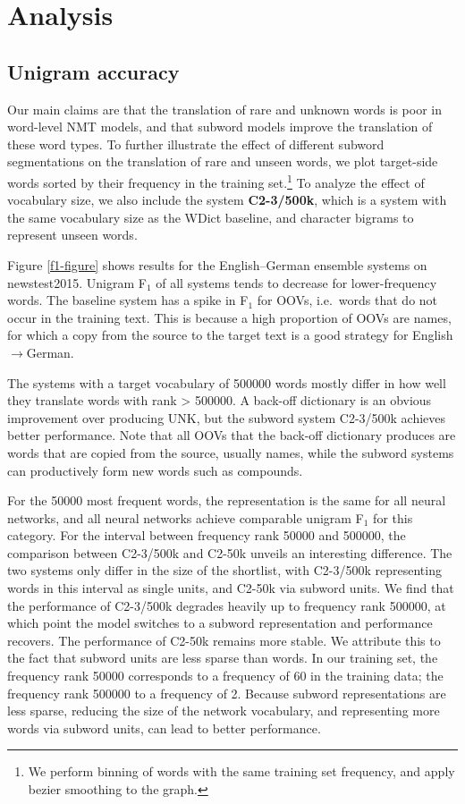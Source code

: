 \documentclass[11pt]{article}
\begin{document}
\section{Analysis}
\label{sec-analysis}

\subsection{Unigram accuracy}

Our main claims are that the translation of rare and unknown words is poor in word-level NMT models, and that subword models improve the translation of these word types.
To further illustrate the effect of different subword segmentations on the translation of rare and unseen words, we plot target-side words sorted by their frequency in the training set.\footnote{We perform binning of words with the same training set frequency, and apply bezier smoothing to the graph.}
To analyze the effect of vocabulary size, we also include the system \textbf{C2-3/500k}, which is a system with the same vocabulary size as the WDict baseline, and character bigrams to represent unseen words.

Figure \ref{f1-figure} shows results for the English--German ensemble systems on newstest2015.
Unigram F$_1$ of all systems tends to decrease for lower-frequency words.
The baseline system has a spike in F$_1$ for OOVs, i.e.\ words that do not occur in the training text.
This is because a high proportion of OOVs are names, for which a copy from the source to the target text is a good strategy for English$\to$German.

The systems with a target vocabulary of \num{500000} words mostly differ in how well they translate words with rank > \num{500000}.
A back-off dictionary is an obvious improvement over producing UNK, but the subword system C2-3/500k achieves better performance.
Note that all OOVs that the back-off dictionary produces are words that are copied from the source, usually names, while the subword systems can productively form new words such as compounds.

For the \num{50000} most frequent words, the representation is the same for all neural networks, and all neural networks achieve comparable unigram F$_1$ for this category.
For the interval between frequency rank \num{50000} and \num{500000}, the comparison between C2-3/500k and C2-50k unveils an interesting difference.
The two systems only differ in the size of the shortlist, with C2-3/500k representing words in this interval as single units, and C2-50k via subword units.
We find that the performance of C2-3/500k degrades heavily up to frequency rank \num{500000}, at which point the model switches to a subword representation and performance recovers.
The performance of C2-50k remains more stable.
We attribute this to the fact that subword units are less sparse than words.
In our training set, the frequency rank \num{50000} corresponds to a frequency of 60 in the training data; the frequency rank \num{500000} to a frequency of 2.
Because subword representations are less sparse, reducing the size of the network vocabulary, and representing more words via subword units, can lead to better performance.
\end{document}
